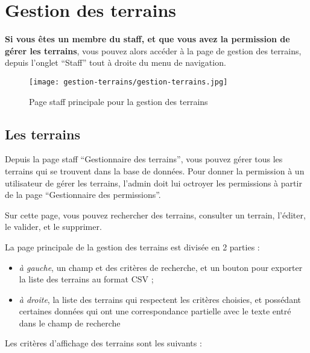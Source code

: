 \section{Gestion des terrains}

\textbf{Si vous êtes un membre du staff, et que vous avez la permission de gérer les terrains}, vous pouvez alors accéder à la page de gestion des terrains, depuis l'onglet \enquote{Staff} tout à droite du menu de navigation.

\begin{figure}[H]
\centering
\texttt{[image: gestion-terrains/gestion-terrains.jpg]}
\caption{Page staff principale pour la gestion des terrains}
\end{figure}

\subsection{Les terrains}

Depuis la page staff \enquote{Gestionnaire des terrains}, vous pouvez gérer tous les terrains qui se trouvent dans la base de données. Pour donner la permission à un utilisateur de gérer les terrains, l'admin doit lui octroyer les permissions à partir de la page \enquote{Gestionnaire des permissions}.

\bigskip

Sur cette page, vous pouvez rechercher des terrains, consulter un terrain, l'éditer, le valider, et le supprimer.\newline

La page principale de la gestion des terrains est divisée en 2 parties :

\begin{itemize}
\item \textit{à gauche}, un champ et des critères de recherche, et un bouton pour exporter la liste des terrains au format CSV ;
\item \textit{à droite}, la liste des terrains qui respectent les critères choisies, et possédant certaines données qui ont une correspondance partielle avec le texte entré dans le champ de recherche
\end{itemize}
\bigskip

Les critères d'affichage des terrains sont les suivants :

